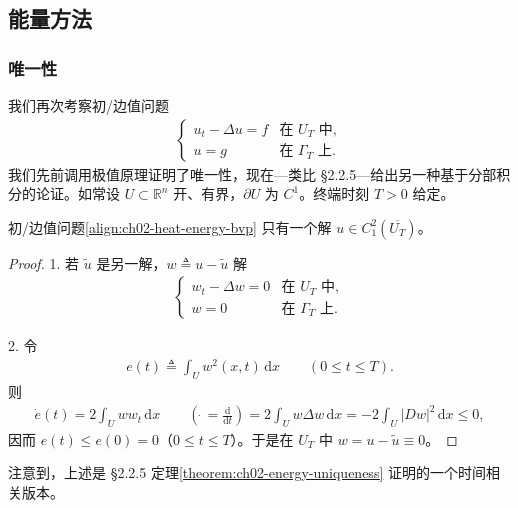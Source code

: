 \documentclass[../../main.tex]{subfiles}
\begin{document}
\subsection{能量方法}\label{subsection:ch02-heat-energy}

\subsubsection{唯一性}

我们再次考察初/边值问题
\begin{align}\label{align:ch02-heat-energy-bvp}
\begin{cases}
u_t-\Delta u=f & \text{在 }U_T\text{ 中},\\
u=g & \text{在 }\Gamma_T\text{ 上}.
\end{cases}
\end{align}
我们先前调用极值原理证明了唯一性，现在---类比 \S2.2.5---给出另一种基于分部积分的论证。如常设 $U\subset\mathbb{R}^n$ 开、有界，$\partial U$ 为 $C^1$。终端时刻 $T>0$ 给定。

\begin{theorem}[唯一性]\label{theorem:ch02-heat-energy-uniqueness}初/边值问题\eqref{align:ch02-heat-energy-bvp} 只有一个解 $u\in C^2_1(\overline{U_T})$。
\end{theorem}

\begin{proof}
1. 若 $\widetilde{u}$ 是另一解，$w\triangleq u-\widetilde{u}$ 解
\begin{align}\label{align:ch02-heat-w2}
\begin{cases}
w_t-\Delta w=0 & \text{在 }U_T\text{ 中},\\
w=0 & \text{在 }\Gamma_T\text{ 上}.
\end{cases}
\end{align}

2. 令
\begin{align*}
e(t)\triangleq\int_U w^2(x,t)\,\mathrm{d}x \qquad (0\leqslant t\leqslant T).
\end{align*}
则
\begin{align*}
\dot{e}(t)=2\int_U w w_t\,\mathrm{d}x \qquad \left(\dot{\ }=\frac{\mathrm{d}}{\mathrm{d}t}\right)
=2\int_U w\Delta w\,\mathrm{d}x=-2\int_U|Dw|^2\,\mathrm{d}x\leqslant 0,
\end{align*}
因而 $e(t)\leqslant e(0)=0$（$0\leqslant t\leqslant T$）。于是在 $U_T$ 中 $w=u-\widetilde{u}\equiv 0$。
\end{proof}

注意到，上述是 \S2.2.5 定理\cref{theorem:ch02-energy-uniqueness} 证明的一个时间相关版本。
\end{document}
